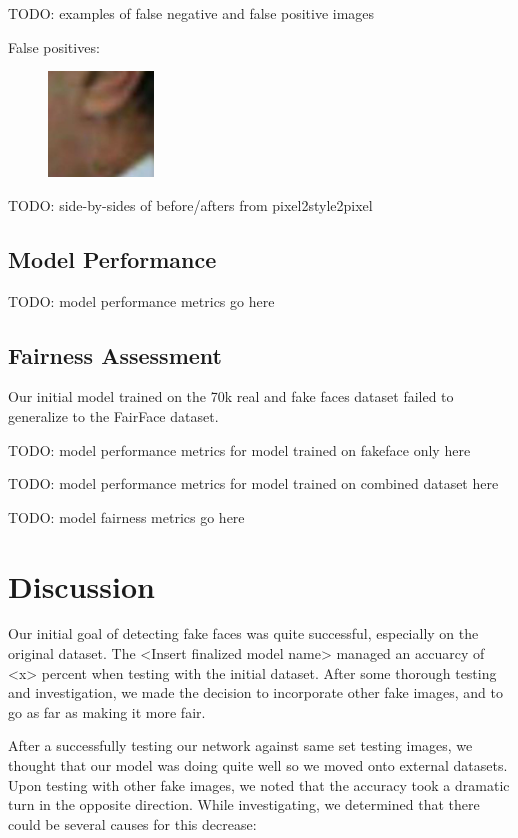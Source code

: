 \documentclass[11pt, letterpaper]{article}
\begin{document}
\begin{multicols}{2}
  TODO: examples of false negative and false positive images

  False positives:

  \begin{figure} %
    \centering
    \includegraphics[width=0.25\textwidth]{figures/crop-failures/dlib/false-positives/fairface/61.jpg}
    \label{falsepos1}
  \end{figure}

  TODO: side-by-sides of before/afters from pixel2style2pixel

  \subsection{Model Performance}

  TODO: model performance metrics go here

  \subsection{Fairness Assessment}

  Our initial model trained on the 70k real and fake faces dataset failed to
  generalize to the FairFace dataset.

  TODO: model performance metrics for model trained on fakeface only here

  TODO: model performance metrics for model trained on combined dataset here

  TODO: model fairness metrics go here

  \section{Discussion}
	Our initial goal of detecting fake faces was quite successful, especially on the original dataset. The <Insert finalized model name> managed an accuarcy of <x> percent when testing with the initial dataset. After some thorough testing and investigation, we made the decision to incorporate other fake images, and to go as far as making it more fair. 
	
	After a successfully testing our network against same set testing images, we thought that our model was doing quite well so we moved onto external datasets. Upon testing with other fake images, we noted that the accuracy took a dramatic turn in the opposite direction. While investigating, we determined that there could be several causes for this decrease:
	

\end{multicols}
\end{document}
